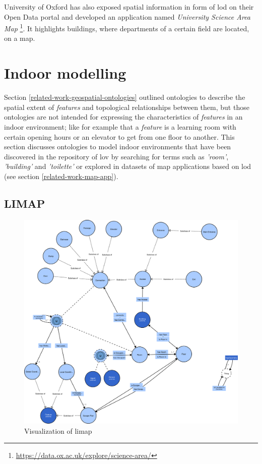 \documentclass[draft,final]{vutinfth} %
\begin{document}
University of Oxford has also exposed spatial information in form of \gls{lod} on their Open Data portal and developed an application named \textit{University Science Area Map} \footnote{\url{https://data.ox.ac.uk/explore/science-area/}}. It highlights buildings, where departments of a certain field are located, on a map. 

\section{Indoor modelling}
\label{related-work-indoor-modelling}
Section \ref{related-work-geospatial-ontologies} outlined ontologies to describe the spatial extent of \textit{features} and topological relationships between them, but those ontologies are not intended for expressing the characteristics of \textit{features} in an indoor environment; like for example that a \textit{feature} is a learning room with certain opening hours or an elevator to get from one floor to another. This section discusses ontologies to model indoor environments that have been discovered in the repository of \gls{lov} by searching for terms such as \textit{'room'}, \textit{'building'} and \textit{'toilette'} or explored in datasets of map applications based on \gls{lod} (see section \ref{related-work-map-app}).

\subsection{LIMAP}
\label{related-work-indoor-modelling-limap}

\begin{figure}[h]
    \centering
    \includegraphics[width=1.0\textwidth]{graphics/vocabularies/limap.png}
    \caption{Visualization of \gls{limap}}
    \label{fig:related-work-geospatial-ontologies:locn}
\end{figure}
\end{document}
